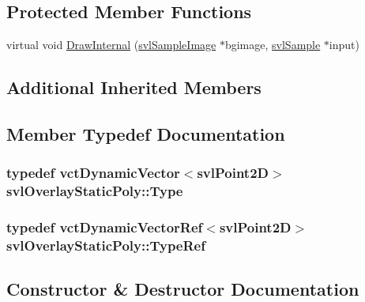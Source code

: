 \subsection*{Protected Member Functions}
\begin{DoxyCompactItemize}
\item 
virtual void \hyperlink{classsvl_overlay_static_poly_a41a22fbb7aa09b6884bc0a74dbf0e9c0}{Draw\+Internal} (\hyperlink{classsvl_sample_image}{svl\+Sample\+Image} $\ast$bgimage, \hyperlink{classsvl_sample}{svl\+Sample} $\ast$input)
\end{DoxyCompactItemize}
\subsection*{Additional Inherited Members}


\subsection{Member Typedef Documentation}
\hypertarget{classsvl_overlay_static_poly_a0c7018bd6af72d2fba86b58f1d966291}{}
\subsubsection[{Type}]{\setlength{\rightskip}{0pt plus 5cm}typedef {\bf vct\+Dynamic\+Vector}$<${\bf svl\+Point2\+D}$>$ {\bf svl\+Overlay\+Static\+Poly\+::\+Type}}\label{classsvl_overlay_static_poly_a0c7018bd6af72d2fba86b58f1d966291}
\hypertarget{classsvl_overlay_static_poly_a2d317856c0cec72b3a76252446a85944}{}
\subsubsection[{Type\+Ref}]{\setlength{\rightskip}{0pt plus 5cm}typedef {\bf vct\+Dynamic\+Vector\+Ref}$<${\bf svl\+Point2\+D}$>$ {\bf svl\+Overlay\+Static\+Poly\+::\+Type\+Ref}}\label{classsvl_overlay_static_poly_a2d317856c0cec72b3a76252446a85944}


\subsection{Constructor \& Destructor Documentation}
\hypertarget{classsvl_overlay_static_poly_aa13d48357d9b195dcee2decede8df1f4}{}
